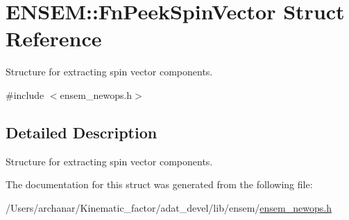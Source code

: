 \hypertarget{structENSEM_1_1FnPeekSpinVector}{}\section{E\+N\+S\+EM\+:\+:Fn\+Peek\+Spin\+Vector Struct Reference}
\label{structENSEM_1_1FnPeekSpinVector}


Structure for extracting spin vector components.  




{\ttfamily \#include $<$ensem\+\_\+newops.\+h$>$}



\subsection{Detailed Description}
Structure for extracting spin vector components. 

The documentation for this struct was generated from the following file\+:\begin{DoxyCompactItemize}
\item 
/\+Users/archanar/\+Kinematic\+\_\+factor/adat\+\_\+devel/lib/ensem/\mbox{\hyperlink{lib_2ensem_2ensem__newops_8h}{ensem\+\_\+newops.\+h}}\end{DoxyCompactItemize}
